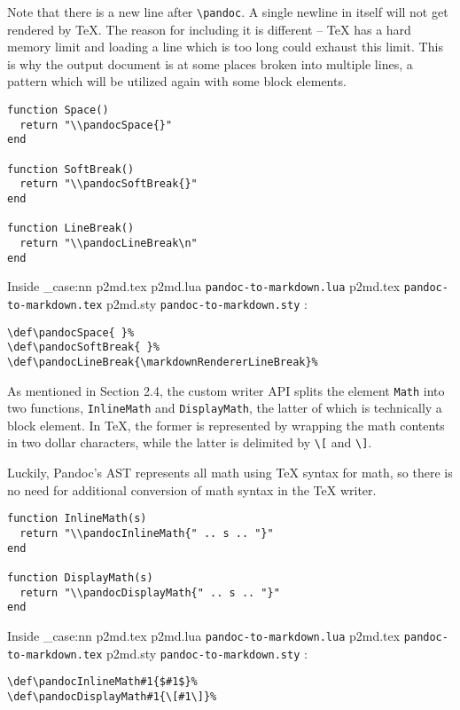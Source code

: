 \documentclass[
  digital,     %
  oneside,     %
  nosansbold,  %
  nocolorbold, %
  lof,         %
  nolot,       %
]{fithesis4}
\newcommand\macro[1]{\texttt{\textbackslash{}{#1}}}
\newcommand\pandoc[1]{\macro{pandoc\-{#1}}}
\newcommand\file[1]
  {
    \str_case:nn
      { #1 }
      {
        { p2md.lua } { \texttt{pandoc\hyp{}to\hyp{}markdown.lua} }
        { p2md.tex } { \texttt{pandoc\hyp{}to\hyp{}markdown.tex} }
        { p2md.sty } { \texttt{pandoc\hyp{}to\hyp{}markdown.sty} }
      }
  }
\begin{document}
Note that there is a new line after \pandoc{LineBreak}. A single newline in itself will not get rendered by \TeX{}. The reason for including it is different -- \TeX{} has a hard memory limit and loading a line which is too long could exhaust this limit. This is why the output document is at some places broken into multiple lines, a pattern which will be utilized again with some block elements.

\noindent
\lstset{language=[5.3]Lua}
\begin{lstlisting}
function Space()
  return "\\pandocSpace{}"
end

function SoftBreak()
  return "\\pandocSoftBreak{}"
end

function LineBreak()
  return "\\pandocLineBreak\n"
end
\end{lstlisting}

\noindent
Inside \file{p2md.tex}:

\noindent
\lstset{language=[plain]TeX}
\begin{lstlisting}
\def\pandocSpace{ }%
\def\pandocSoftBreak{ }%
\def\pandocLineBreak{\markdownRendererLineBreak}%
\end{lstlisting}

\noindent
As mentioned in Section 2.4, the custom writer API splits the element \texttt{Math} into two functions, \texttt{InlineMath} and \texttt{DisplayMath}, the latter of which is technically a block element. In \TeX{}, the former is represented by wrapping the math contents in two dollar characters, while the latter is delimited by \texttt{\textbackslash{}[} and \texttt{\textbackslash{}]}.

Luckily, Pandoc's AST represents all math using \TeX{} syntax for math, so there is no need for additional conversion of math syntax in the \TeX{} writer.

\noindent
\lstset{language=[5.3]Lua}
\begin{lstlisting}
function InlineMath(s)
  return "\\pandocInlineMath{" .. s .. "}"
end

function DisplayMath(s)
  return "\\pandocDisplayMath{" .. s .. "}"
end
\end{lstlisting}

\noindent
Inside \file{p2md.tex}:

\noindent
\lstset{language=[plain]TeX}
\begin{lstlisting}
\def\pandocInlineMath#1{$#1$}%
\def\pandocDisplayMath#1{\[#1\]}%
\end{lstlisting}
\end{document}
